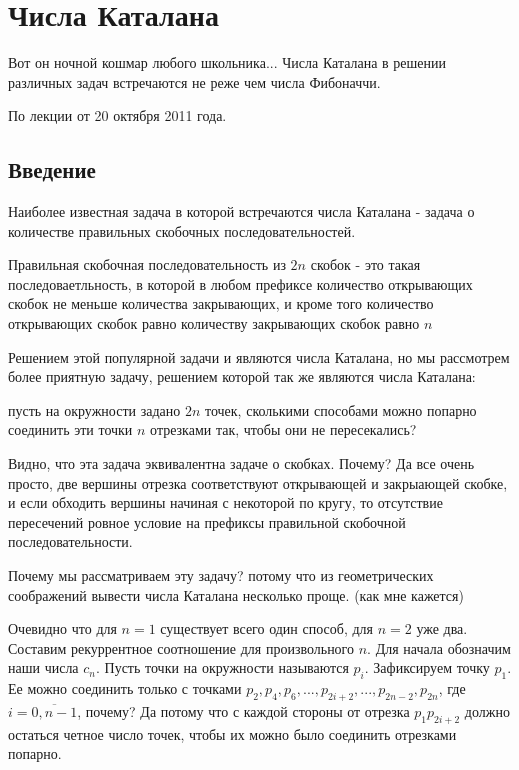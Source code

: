 \chapter{Числа Каталана}

Вот он ночной кошмар любого школьника... Числа Каталана в решении различных задач встречаются не реже чем числа Фибоначчи.

По лекции от 20 октября 2011 года.

\section{Введение}

Наиболее известная задача в которой встречаются числа Каталана - задача о количестве правильных скобочных последовательностей.

\begin{Def}
Правильная скобочная последовательность из $2n$ скобок - это такая последоваетльность, в которой в любом префиксе количество открывающих скобок не меньше количества закрывающих, и кроме того количество открывающих скобок равно количеству закрывающих скобок равно $n$
\end{Def}

Решением этой популярной задачи и являются числа Каталана, но мы рассмотрем более приятную задачу, решением которой так же являются числа Каталана:

пусть на окружности задано $2n$ точек, сколькими способами можно попарно соединить эти точки $n$ отрезками так, чтобы они не пересекались?

Видно, что эта задача эквивалентна задаче о скобках.
Почему? Да все очень просто, две вершины отрезка соответствуют открывающей и закрыающей скобке, и если обходить вершины начиная с некоторой по кругу, то отсутствие пересечений ровное условие на префиксы правильной скобочной последовательности.

Почему мы рассматриваем эту задачу? потому что из геометрических соображений вывести числа Каталана несколько проще. (как мне кажется)

Очевидно что для $n=1$ существует всего один способ, для $n=2$ уже два. Составим рекуррентное соотношение для произвольного $n$. Для начала обозначим наши числа $c_n$. Пусть точки на окружности называются $p_i$. Зафиксируем точку $p_1$. Ее можно соединить только с точками $p_2, p_4, p_6, ... , p_{2i + 2}, ... , p_{2 n - 2}, p_{2 n}$, где $i = \overline{0, n-1}$, почему? Да потому что с каждой стороны от отрезка $p_1 p_{2i+2}$ должно остаться четное число точек, чтобы их можно было соединить отрезками попарно.

